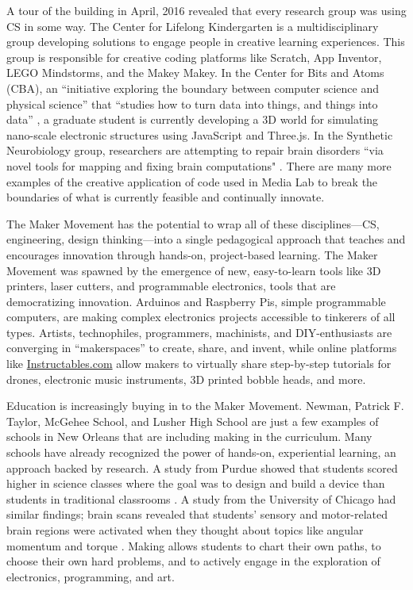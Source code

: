A tour of the building in April, 2016 revealed that every research group was using CS in some way. The Center for Lifelong Kindergarten is a multidisciplinary group developing solutions to engage people in creative learning experiences. This group is responsible for creative coding platforms like Scratch, App Inventor, LEGO Mindstorms, and the Makey Makey. In the Center for Bits and Atoms (CBA), an ``initiative exploring the boundary between computer science and physical science'' that ``studies how to turn data into things, and things into data'' \cite{cba}, a graduate student is currently developing a 3D world for simulating nano-scale electronic structures using JavaScript and Three.js. In the Synthetic Neurobiology group, researchers are attempting to repair brain disorders ``via novel tools for mapping and fixing brain computations" \cite{synth}. There are many more examples of the creative application of code used in Media Lab to break the boundaries of what is currently feasible and continually innovate. \par
The Maker Movement has the potential to wrap all of these disciplines---CS, engineering, design thinking---into a single pedagogical approach that teaches and encourages innovation through hands-on, project-based learning. The Maker Movement was spawned by the emergence of new, easy-to-learn tools like 3D printers, laser cutters, and programmable electronics, tools that are democratizing innovation. Arduinos and Raspberry Pis, simple programmable computers, are making complex electronics projects accessible to tinkerers of all types. Artists, technophiles, programmers, machinists, and DIY-enthusiasts are converging in ``makerspaces'' to create, share, and invent, while online platforms like \href{http://instructables.com}{Instructables.com} allow makers to virtually share step-by-step tutorials for drones, electronic music instruments, 3D printed bobble heads, and more.\par
Education is increasingly buying in to the Maker Movement. Newman, Patrick F. Taylor, McGehee School, and Lusher High School are just a few examples of schools in New Orleans that are including making in the curriculum. Many schools have already recognized the power of hands-on, experiential learning, an approach backed by research. A study from Purdue showed that students scored higher in science classes where the goal was to design and build a device than students in traditional classrooms \cite{purdue}. A study from the University of Chicago had similar findings; brain scans revealed that students' sensory and motor-related brain regions were activated when they thought about topics like angular momentum and torque \cite{uchic}. Making allows students to chart their own paths, to choose their own hard problems, and to actively engage in the exploration of electronics, programming, and art.\par  
